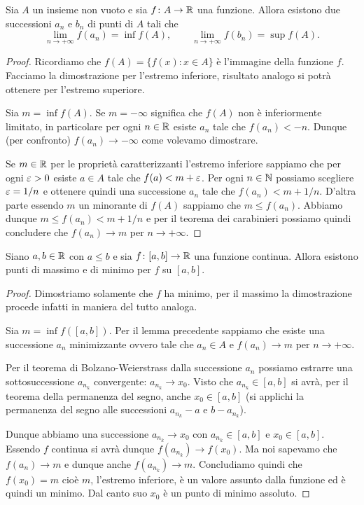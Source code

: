 \begin{lemma}
Sia $A$ un insieme non vuoto e
sia $f\colon A \to \mathbb R$ una funzione. Allora esistono
due successioni $a_n$ e $b_n$ di punti di $A$ tali che
\[
  \lim_{n\to +\infty} f(a_n) = \inf f(A), \qquad
  \lim_{n\to +\infty} f(b_n) = \sup f(A).
\]
\end{lemma}
%
\begin{proof}
Ricordiamo che $f(A) = \{f(x)\colon x \in A\}$ è l'immagine
della funzione $f$. Facciamo la dimostrazione per l'estremo inferiore,
risultato analogo si potrà ottenere per l'estremo superiore.

Sia $m=\inf f(A)$.
Se $m=-\infty$ significa che $f(A)$ non è inferiormente limitato, in particolare per ogni $n\in \mathbb R$ esiste $a_n$ tale che $f(a_n) < - n$.
Dunque (per confronto) $f(a_n) \to -\infty$ come volevamo dimostrare.

Se $m\in \mathbb R$ per le proprietà caratterizzanti l'estremo inferiore sappiamo che per ogni $\varepsilon>0$ esiste $a\in A$ tale che $f(a) < m + \varepsilon$.
Per ogni $n\in\mathbb N$ possiamo scegliere $\varepsilon=1/n$ e ottenere quindi una successione $a_n$ tale che $f(a_n) < m + 1/n$.
D'altra parte essendo $m$ un minorante di $f(A)$ sappiamo che $m \le f(a_n)$. Abbiamo dunque $m \le f(a_n) < m+ 1/n$ e per il teorema dei carabinieri possiamo quindi concludere che $f(a_n) \to m$ per $n\to +\infty$.
\end{proof}

\begin{theorem}[Weierstrass]
\mymark{***}
Siano $a,b\in \mathbb R$ con $a\le b$
e sia $f\colon [a,b]\to \mathbb R$ una funzione continua.
Allora
esistono punti di massimo e di minimo per $f$ su $[a,b]$.
\end{theorem}
%
\begin{proof}
\mymark{***}
Dimostriamo solamente che $f$ ha minimo, per il massimo la dimostrazione procede
infatti in maniera del tutto analoga.

Sia $m= \inf f([a,b])$.
Per il lemma precedente sappiamo che esiste una successione $a_n$ minimizzante ovvero tale che
$a_n \in A$ e $f(a_n)\to m$ per $n\to +\infty$.

Per il teorema di Bolzano-Weierstrass dalla successione $a_n$ possiamo estrarre una sottosuccessione $a_{n_k}$ convergente: $a_{n_k} \to x_0$.
Visto che $a_{n_k} \in [a,b]$ si avrà, per il teorema della permanenza del segno, anche $x_0 \in [a,b]$ (si applichi la permanenza del segno alle successioni $a_{n_k}-a$ e $b-a_{n_k}$).

Dunque abbiamo una successione $a_{n_k}\to x_0$ con $a_{n_k}\in [a,b]$ e
$x_0 \in [a,b]$. Essendo $f$ continua si avrà dunque $f(a_{n_k}) \to f(x_0)$.
Ma noi sapevamo che $f(a_n)\to m$ e dunque anche $f(a_{n_k}) \to m$.
Concludiamo quindi che $f(x_0) = m$ cioè $m$, l'estremo inferiore,
è un valore assunto dalla funzione ed è quindi un minimo.
Dal canto suo $x_0$ è un punto di minimo assoluto.
\end{proof}

